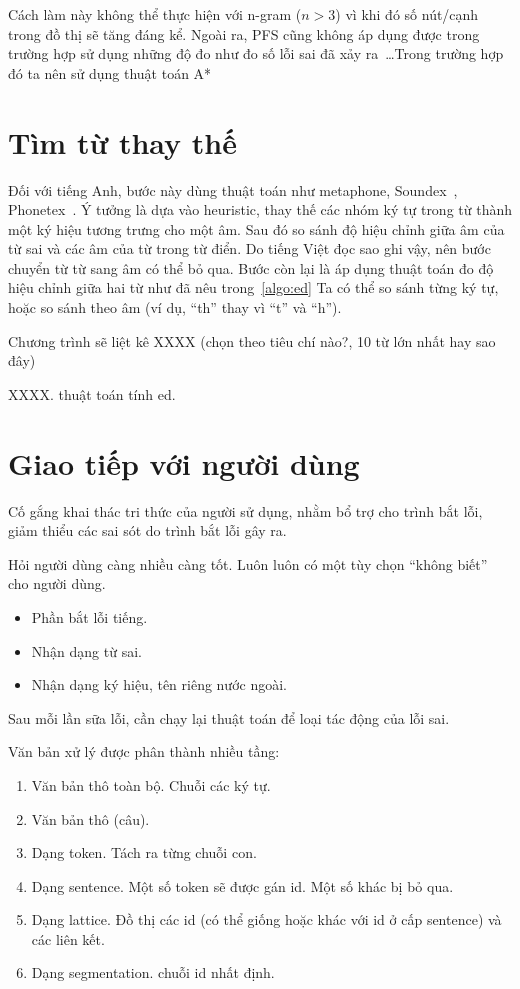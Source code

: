 \documentclass[a4paper,oneside]{book} %
\theoremstyle{break}
\begin{document}
Cách làm này không thể thực hiện với n-gram ($n > 3$) vì khi đó số
nút/cạnh trong đồ thị sẽ tăng đáng kể. Ngoài ra, PFS cũng không áp
dụng được trong trường hợp sử dụng những độ đo như đo số lỗi sai đã
xảy ra~\ldots Trong trường hợp đó ta nên sử dụng thuật toán A*~\cite{Ravishankar}



\section{Tìm từ thay thế}

Đối với tiếng Anh, bước này dùng thuật toán như metaphone,
Soundex~\cite{soundex},
Phonetex~\cite{phonetex}. Ý tưởng 
là dựa vào heuristic, thay thế các nhóm ký tự trong từ thành một ký
hiệu tương trưng cho một âm. Sau đó so sánh độ hiệu chỉnh giữa âm của
từ sai và các âm của từ trong từ điển. Do tiếng Việt đọc sao ghi vậy,
nên bước chuyển từ từ sang âm có thể bỏ qua. Bước còn lại là áp dụng
thuật toán đo độ hiệu chỉnh giữa hai từ như đã nêu trong~\ref{algo:ed}
Ta có thể so sánh từng ký tự, hoặc so sánh theo âm (ví dụ, ``th'' thay
vì ``t'' và ``h'').

Chương trình sẽ liệt kê XXXX (chọn theo tiêu chí nào?, 10 từ lớn nhất
hay sao đây)

XXXX. thuật toán tính ed.

\section{Giao tiếp với người dùng}
\label{sec:ui}

Cố gắng khai thác tri thức của người sử dụng, nhằm bổ trợ cho trình
bắt lỗi, giảm thiểu các sai sót do trình bắt lỗi gây ra.

Hỏi người dùng càng nhiều càng tốt. Luôn luôn có một tùy chọn ``không
biết'' cho người dùng.

\begin{itemize}
\item Phần bắt lỗi tiếng.
\item Nhận dạng từ sai.
\item Nhận dạng ký hiệu, tên riêng nước ngoài.
\end{itemize}

Sau mỗi lần sữa lỗi, cần chạy lại thuật toán để loại tác động của lỗi
sai.

Văn bản xử lý được phân thành nhiều tầng:
\begin{enumerate}
\item Văn bản thô toàn bộ. Chuỗi các ký tự.
\item Văn bản thô (câu).
\item Dạng token. Tách ra từng chuỗi con.
\item Dạng sentence. Một số token sẽ được gán id. Một số khác bị bỏ
  qua. 
\item Dạng lattice. Đồ thị các id (có thể giống hoặc khác với id ở cấp
  sentence) và các liên kết. 
\item Dạng segmentation. chuỗi id nhất định.
\end{enumerate}
\end{document}
